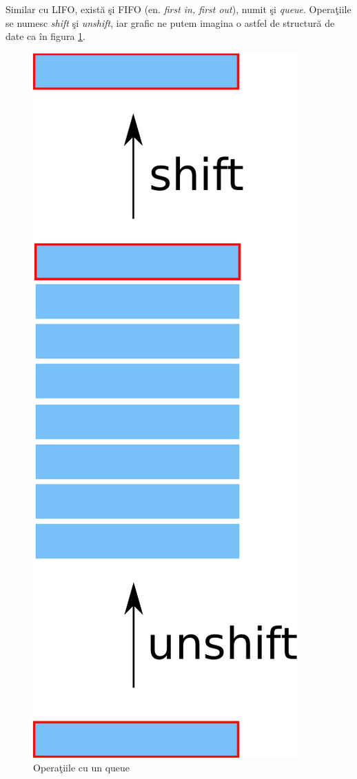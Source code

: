 Similar cu LIFO, există şi FIFO (en. \textsl{first in, first out}),
numit şi \textsl{queue}. Operaţiile se numesc \textsl{shift} şi \textsl{unshift},
iar grafic ne putem imagina o astfel de structură de date ca în
figura \ref{fig:queue}.

\begin{figure}[h!]
  \centering
    \includegraphics[scale=.3]{cap03/queue-crop.pdf}
  \caption{Operaţiile cu un queue}
  \label{fig:queue}
\end{figure}

